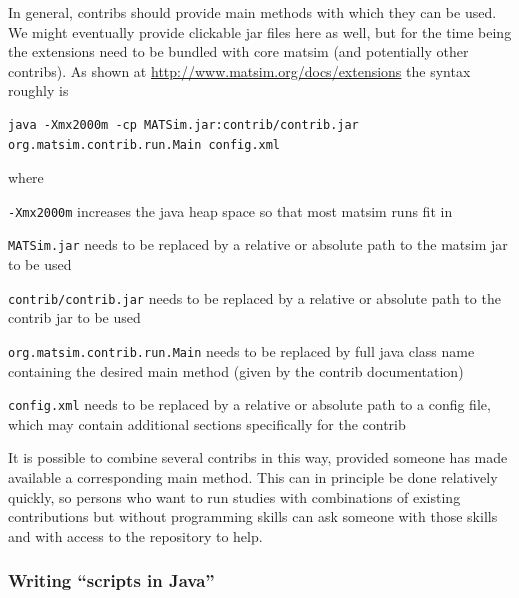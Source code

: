 In general, contribs should provide main methods with which they can be used.  We might eventually provide clickable jar files here as well, but for the time being the extensions need to be bundled with core \acrshort{matsim} (and potentially other contribs). As shown at \url{http://www.matsim.org/docs/extensions} the syntax roughly is
\begin{lstlisting}
java -Xmx2000m -cp MATSim.jar:contrib/contrib.jar org.matsim.contrib.run.Main config.xml  
\end{lstlisting}
 
where
\begin{compactitem}
\item \lstinline$-Xmx2000m$ increases the \gls{java} heap space so that most \acrshort{matsim} runs fit in
\item \lstinline$MATSim.jar$ needs to be replaced by a relative or absolute path to the \acrshort{matsim} jar to be used
\item \lstinline$contrib/contrib.jar$ needs to be replaced by a relative or absolute path to the contrib jar to be used
\item \lstinline$org.matsim.contrib.run.Main$ needs to be replaced by full java class name containing the desired main method (given by the contrib documentation)
\item \lstinline$config.xml$ needs to be replaced by a relative or absolute path to a config file, which may contain additional sections specifically for the contrib
\end{compactitem}

It is possible to combine several contribs in this way, provided someone has made available a corresponding main method.  This can in principle be done relatively quickly, so persons who want to run studies with combinations of existing contributions but without programming skills can ask someone with those skills and with access to the repository to help.

\subsubsection{Writing ``scripts in Java''}
\label{sec:writing-scripts-java}

